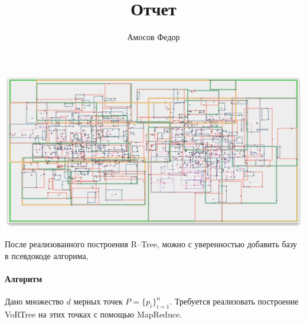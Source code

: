 \documentclass{article}
\title{\bf Отчет \No 3}
\author{Амосов Федор}
\begin{document}
	\maketitle
	
	\begin{center}
	    \includegraphics[scale = 0.25]{r-tree.png}
	\end{center}
	
	
    После реализованного построения R--Tree, можно с уверенностью добавить базу в псевдокоде алгорима,
	
	\paragraph{Алгоритм \\}
	    Дано множество $d$ мерных точек $P = \{p_i\}_{i = 1}^n$. Требуется реализовать построение VoRTree на этих точках с помощью MapReduce.
	   
\end{document}
